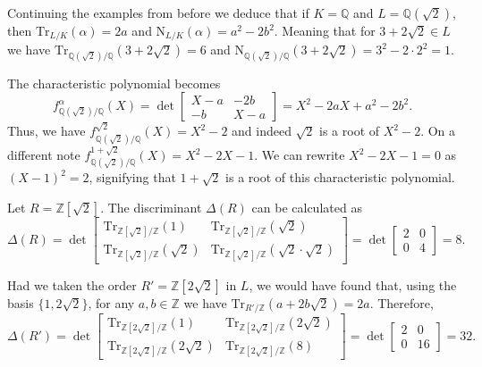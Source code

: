 \documentclass[openany, a4paper, 10pt]{book}
\theoremstyle{plain}
\theoremstyle{plain}
\theoremstyle{plain}
\theoremstyle{definition}
\theoremstyle{plain}
\theoremstyle{definition}
\theoremstyle{remark}
\begin{document}
\begin{examplebox}
    Continuing the examples from before we deduce that if
    $K = \mathbb Q$ and $L = \mathbb Q(\sqrt{2})$,
    then $\mathrm{Tr}_{L/K}(\alpha) = 2a$ and $\mathrm{N}_{L/K}(\alpha) = a^2-2b^2$.
    Meaning that for $3+2\sqrt{2} \in L$ we have
    $\mathrm{Tr}_{\mathbb Q(\sqrt{2})/\mathbb Q}(3+2\sqrt{2}) = 6$
    and
    $\mathrm{N}_{\mathbb Q(\sqrt{2})/\mathbb Q}(3+2\sqrt{2}) = 3^2-2\cdot 2^2 = 1$.

    The characteristic polynomial becomes
    $$f_{\mathbb Q(\sqrt{2})/\mathbb Q}^\alpha(X) = \det \begin{bmatrix} X-a & -2b \\ -b & X-a \end{bmatrix} = X^2-2aX + a^2-2b^2.$$
    Thus, we have
    $f_{\mathbb Q(\sqrt{2})/\mathbb Q}^{\sqrt{2}}(X) = X^2-2$
    and indeed $\sqrt{2}$ is a root of $X^2-2$.
    On a different note
    $f_{\mathbb Q(\sqrt{2})/\mathbb Q}^{1+\sqrt{2}}(X) = X^2-2X-1.$
    We can rewrite $X^2-2X-1=0$ as $(X-1)^2=2$, signifying that $1+\sqrt{2}$ is a root of this characteristic polynomial.

    Let $R = \mathbb Z[\sqrt{2}]$.
    The discriminant $\Delta(R)$ can be calculated as
    \begin{equation*}
        \Delta(R) = \det \begin{bmatrix} \mathrm{Tr}_{\mathbb Z[\sqrt{2}]/\mathbb Z}(1) & \mathrm{Tr}_{\mathbb Z[\sqrt{2}]/\mathbb Z}(\sqrt{2}) \\ \mathrm{Tr}_{\mathbb Z[\sqrt{2}]/\mathbb Z}(\sqrt{2}) & \mathrm{Tr}_{\mathbb Z[\sqrt{2}]/\mathbb Z}(\sqrt{2}\cdot \sqrt{2}) \end{bmatrix}
        = \det \begin{bmatrix} 2 & 0 \\ 0 & 4 \end{bmatrix} = 8.
    \end{equation*}

    Had we taken the order $R' = \mathbb Z[2\sqrt{2}]$ in $L$, we would have found that, using the basis $\{ 1, 2\sqrt{2} \}$, for any $a,b \in \mathbb Z$ we have $\mathrm{Tr}_{R'/\mathbb Z}(a+2b\sqrt{2}) = 2a$.
    Therefore,
    \begin{equation*}
        \Delta(R') = \det \begin{bmatrix} \mathrm{Tr}_{\mathbb Z[2\sqrt{2}]/\mathbb Z}(1) & \mathrm{Tr}_{\mathbb Z[2\sqrt{2}]/\mathbb Z}(2\sqrt{2}) \\ \mathrm{Tr}_{\mathbb Z[2\sqrt{2}]/\mathbb Z}(2\sqrt{2}) & \mathrm{Tr}_{\mathbb Z[2\sqrt{2}]/\mathbb Z}(8) \end{bmatrix}
        = \det \begin{bmatrix} 2 & 0 \\ 0 & 16 \end{bmatrix} = 32.
    \end{equation*}


\end{examplebox}
\end{document}
